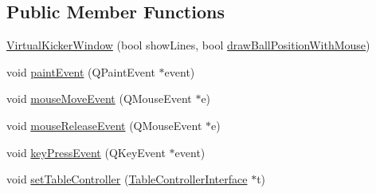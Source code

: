 \subsection*{Public Member Functions}
\begin{DoxyCompactItemize}
\item 
\hyperlink{class_virtual_kicker_window_a90e6ed52bb616a8d4f2710468ff4788d}{Virtual\+Kicker\+Window} (bool show\+Lines, bool \hyperlink{class_virtual_kicker_window_a8261365dd31ecf1a929df329a6be3f82}{draw\+Ball\+Position\+With\+Mouse})
\item 
void \hyperlink{class_virtual_kicker_window_a03f518f4d2117a91997020263704037b}{paint\+Event} (Q\+Paint\+Event $\ast$event)
\item 
void \hyperlink{class_virtual_kicker_window_ab252b09be5f0704973202148df3ff268}{mouse\+Move\+Event} (Q\+Mouse\+Event $\ast$e)
\item 
void \hyperlink{class_virtual_kicker_window_a93a06a615b044f8429b6f87bccba4cf8}{mouse\+Release\+Event} (Q\+Mouse\+Event $\ast$e)
\item 
void \hyperlink{class_virtual_kicker_window_af7f4325e898b91d22f4e2f1dd99883a9}{key\+Press\+Event} (Q\+Key\+Event $\ast$event)
\item 
void \hyperlink{class_virtual_kicker_window_aebfc1a6d50c09cef79f8baceba9cc210}{set\+Table\+Controller} (\hyperlink{class_table_controller_interface}{Table\+Controller\+Interface} $\ast$t)
\end{DoxyCompactItemize}
